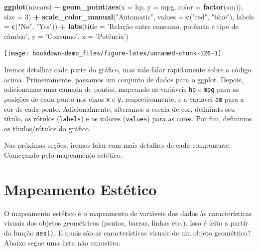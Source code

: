 \documentclass[]{book}
\newenvironment{Shaded}{\begin{snugshade}}{\end{snugshade}}
\newcommand{\KeywordTok}[1]{\textcolor[rgb]{0.13,0.29,0.53}{\textbf{#1}}}
\newcommand{\DataTypeTok}[1]{\textcolor[rgb]{0.13,0.29,0.53}{#1}}
\newcommand{\DecValTok}[1]{\textcolor[rgb]{0.00,0.00,0.81}{#1}}
\newcommand{\StringTok}[1]{\textcolor[rgb]{0.31,0.60,0.02}{#1}}
\newcommand{\OperatorTok}[1]{\textcolor[rgb]{0.81,0.36,0.00}{\textbf{#1}}}
\newcommand{\NormalTok}[1]{#1}
\begin{document}
\begin{Shaded}
\begin{Highlighting}[]
\KeywordTok{ggplot}\NormalTok{(mtcars) }\OperatorTok{+}
\StringTok{  }\KeywordTok{geom_point}\NormalTok{(}\KeywordTok{aes}\NormalTok{(}\DataTypeTok{x =}\NormalTok{ hp, }\DataTypeTok{y =}\NormalTok{ mpg, }\DataTypeTok{color =} \KeywordTok{factor}\NormalTok{(am)),}
             \DataTypeTok{size =} \DecValTok{3}\NormalTok{) }\OperatorTok{+}
\StringTok{  }\KeywordTok{scale_color_manual}\NormalTok{(}\StringTok{"Automatic"}\NormalTok{,}
                     \DataTypeTok{values =} \KeywordTok{c}\NormalTok{(}\StringTok{"red"}\NormalTok{, }\StringTok{"blue"}\NormalTok{),}
                     \DataTypeTok{labels =} \KeywordTok{c}\NormalTok{(}\StringTok{"No"}\NormalTok{, }\StringTok{"Yes"}\NormalTok{)) }\OperatorTok{+}
\StringTok{  }\KeywordTok{labs}\NormalTok{(}\DataTypeTok{title =} \StringTok{'Relação entre consumo, potência e tipo de câmbio'}\NormalTok{,}
       \DataTypeTok{y =} \StringTok{'Consumo'}\NormalTok{,}
       \DataTypeTok{x =} \StringTok{'Potência')}
\end{Highlighting}
\end{Shaded}

\begin{center}\texttt{[image: bookdown-demo\_files/figure-latex/unnamed-chunk-126-1]} \end{center}

Iremos detalhar cada parte do gráfico, mas vale falar rapidamente sobre
o código acima. Primeiramente, passamos um conjunto de dados para o
ggplot. Depois, adicionamos uma camada de pontos, mapeando as variáveis
\texttt{hp} e \texttt{mpg} para as posições de cada ponto nos eixos
\texttt{x} e \texttt{y}, respectivamente, e a variável \texttt{am} para
a cor de cada ponto. Adicionalmente, alteramos a escala de cor,
definindo seu título, os rótulos (\texttt{labels}) e os valores
(\texttt{values}) para as cores. Por fim, definimos os títulos/rótulos
do gráfico.

Nas próximas seções, iremos falar com mais detalhes de cada componente.
Começando pelo mapeamento estético.

\section{Mapeamento Estético}\label{mapeamento-estetico}

O mapeamento estético é o mapeamento de variáveis dos dados às
características visuais dos objetos geométricos (pontos, barras, linhas
etc.). Isso é feito a partir da função \texttt{aes()}. E quais são as
características visuais de um objeto geométrico? Abaixo segue uma lista
não exaustiva:
\end{document}

